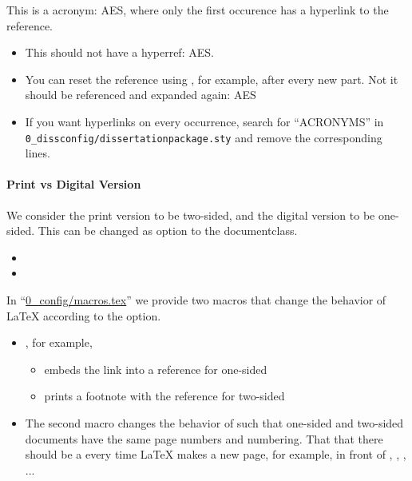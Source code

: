 This is a acronym: \gls{AES}, where only the first occurence has a hyperlink to the reference. 
\begin{itemize}
	\item This should not have a hyperref: \gls{AES}. 
	\item You can reset the reference using \detokenize{\glsresetall}, for example, after every new part. 
\glsresetall{} 
Not it should be referenced and expanded again: \gls{AES} 
	\item If you want hyperlinks on every occurrence, search for ``ACRONYMS'' in \lstinline{0_dissconfig/dissertationpackage.sty} and remove the corresponding lines. 
\end{itemize}



\FloatBarrier
\paragraph{Print vs Digital Version}

We consider the print version to be two-sided, and the digital version to be one-sided. This can be changed as option to the documentclass.

\begin{itemize}
	\item {}
	\item {}
\end{itemize}

In ``\url{0_config/macros.tex}'' we provide two macros that change the behavior of LaTeX according to the option.

\begin{itemize}
 	\item {}, for example, 
 	\begin{itemize}
 		\item embeds the link into a reference for one-sided
 		\item prints a footnote with the reference for two-sided
 	\end{itemize}
 	\item The second macro changes the behavior of \detokenize{\cleardoublepage} such that one-sided and two-sided documents have the same page numbers and numbering. That that there should be a \detokenize{\cleardoublepage} every time LaTeX makes a new page, for example, in front of \detokenize{\part}, \detokenize{}, \detokenize{\chapter}, ... 
 \end{itemize} 


\cleardoublepage





